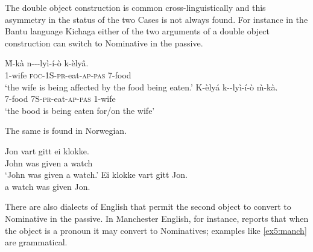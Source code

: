 The double object construction is common cross-linguistically and this asymmetry in the status of the two Cases is not always found. For instance in the Bantu language Kichaga either of the two arguments of a double object construction can switch to Nominative in the passive.%
%
%
%
\begin{exe}
	\raggedright
	\ex \label{ex5:kichaga} 
	\begin{xlist}
		\ex \gll \`{M}-k\`{a} n--\textipa{\H{\i}}-ly\`{i}-\'i-\`{o} k-\`{e}ly\^{a}. \\ 1-wife \textsc{foc}-1S-\textsc{pr}-eat-\textsc{ap}-\textsc{pas} 7-food  \\ `the wife is being affected by the food being eaten.'
		\ex \gll K-\`{e}ly\'{a} k-\textipa{\H{\i}}-ly\`{i}-\'{i}-\`{o} \`{m}-k\`{a}. \\ 7-food 7S-\textsc{pr}-eat-\textsc{ap}-\textsc{pas} 1-wife  \\ `the bood is being eaten for/on the wife'
	\end{xlist}
	\hspace*{\fill} \citep[(5):p.~150]{Bresnan:1990} \hspace*{.5in}
\end{exe}
The same is found in Norwegian.
\begin{exe}
	\raggedright
	\ex \label{ex5:norwegian} 
	\begin{xlist}
		\ex \gll Jon vart gitt ei klokke. \\ John was given a watch \\ `John was given a watch.'
		\ex \gll Ei klokke vart gitt Jon. \\ a watch was given Jon. \\ 
	\end{xlist}
	\hspace*{\fill} \citep[(2):p.~682]{Woolford:1993} \hspace*{.5in}
\end{exe}
There are also dialects of English that permit the second object to convert to Nominative in the passive. In Manchester English, for instance, \citet{Haddican:2010} reports that when the object is a pronoun it may convert to Nominatives; examples like \ref{ex5:manch} are grammatical.
